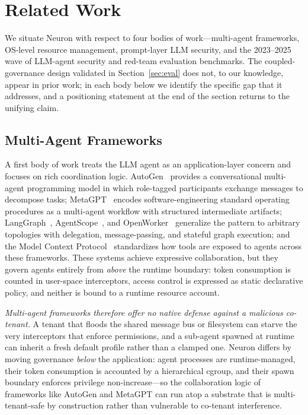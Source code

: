 \section{Related Work}
\label{sec:rw}

We situate Neuron with respect to four bodies of work---multi-agent
frameworks, OS-level resource management, prompt-layer LLM security, and
the 2023--2025 wave of LLM-agent security and red-team evaluation
benchmarks. The coupled-governance design validated in Section~\ref{sec:eval}
does not, to our knowledge, appear in prior work; in each body below we
identify the specific gap that it addresses, and a positioning statement at
the end of the section returns to the unifying claim.

\subsection{Multi-Agent Frameworks}
\label{sec:rw-maf}

A first body of work treats the LLM agent as an application-layer concern and
focuses on rich coordination logic. AutoGen~\cite{wu2023autogen} provides a
conversational multi-agent programming model in which role-tagged
participants exchange messages to decompose tasks;
MetaGPT~\cite{hong2023metagpt} encodes software-engineering standard
operating procedures as a multi-agent workflow with structured intermediate
artifacts; LangGraph~\cite{langgraph2024}, AgentScope~\cite{agentscope2024},
and OpenWorker~\cite{openworker} generalize the pattern to arbitrary
topologies with delegation, message-passing, and stateful graph execution;
and the Model Context Protocol~\cite{anthropic2024mcp} standardizes how
tools are exposed to agents across these frameworks. These systems achieve
expressive collaboration, but they govern agents entirely from \emph{above}
the runtime boundary: token consumption is counted in user-space interceptors,
access control is expressed as static declarative policy, and neither is
bound to a runtime resource account.

\emph{Multi-agent frameworks therefore offer no native defense against a
malicious co-tenant.} A tenant that floods the shared message bus
or filesystem can starve the very interceptors that enforce permissions, and
a sub-agent spawned at runtime can inherit a fresh default profile rather
than a clamped one. Neuron differs by moving governance \emph{below} the
application: agent processes are runtime-managed, their token consumption is
accounted by a hierarchical cgroup, and their spawn boundary enforces
privilege non-increase---so the collaboration logic of frameworks like
AutoGen and MetaGPT can run atop a substrate that is multi-tenant-safe by
construction rather than vulnerable to co-tenant interference.

